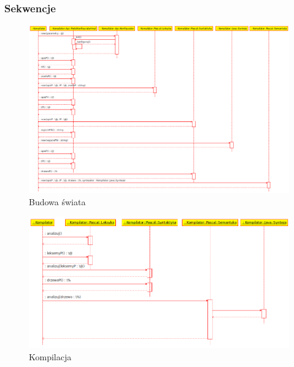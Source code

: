 \documentclass[a4paper,12pt]{article}
\begin{document}
\subsubsection{Sekwencje}
\begin{figure}[h!]
   \includegraphics[width=15cm]{grafika/model/rozruch.png}
   \caption{Budowa świata}
\end{figure}

\begin{figure}[h!]
   \includegraphics[width=15cm]{grafika/model/analizy.png}
   \caption{Kompilacja}
\end{figure}

\newpage
\end{document}
